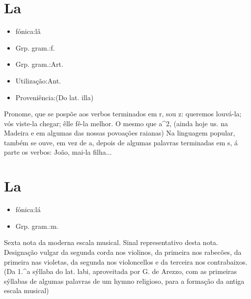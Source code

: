 \section{La}
\begin{itemize}
\item {fónica:lâ}
\end{itemize}
\begin{itemize}
\item {Grp. gram.:f.}
\end{itemize}
\begin{itemize}
\item {Grp. gram.:Art.}
\end{itemize}
\begin{itemize}
\item {Utilização:Ant.}
\end{itemize}
\begin{itemize}
\item {Proveniência:(Do lat. \textunderscore illa\textunderscore )}
\end{itemize}
Pronome, que se pospõe aos verbos terminados em \textunderscore r\textunderscore , \textunderscore s\textunderscore  ou \textunderscore z\textunderscore : \textunderscore queremos louvá-la\textunderscore ; \textunderscore vós viste-la chegar\textunderscore ; \textunderscore êlle fê-la melhor\textunderscore .
O mesmo que \textunderscore a\textunderscore ^2, (ainda hoje us. na Madeira e em algumas das nossas povoações raianas) Na linguagem popular, também se ouve, em vez de \textunderscore a\textunderscore , depois de algumas palavras terminadas em \textunderscore s\textunderscore , á parte os verbos: \textunderscore João, mai-la filha...\textunderscore 
\section{La}
\begin{itemize}
\item {fónica:lá}
\end{itemize}
\begin{itemize}
\item {Grp. gram.:m.}
\end{itemize}
Sexta nota da moderna escala musical.
Sinal representativo desta nota.
Designação vulgar da segunda corda nos violinos, da primeira nos rabecões, da primeira nas violetas, da segunda nos violoncellos e da terceira nos contrabaixos.
(Da 1.^a sýllaba do lat. \textunderscore labi\textunderscore , aproveitada por G. de Arezzo, com as primeiras sýllabas de algumas palavras de um hymno religioso, para a formação da antiga escala musical)
